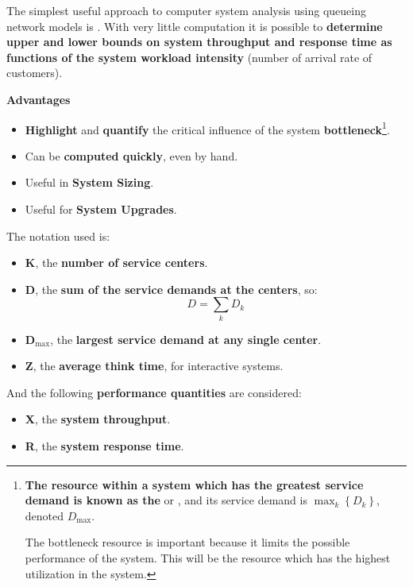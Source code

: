 The simplest useful approach to computer system analysis using queueing network models is . With very little computation it is possible to \textbf{determine upper and lower bounds on system throughput and response time as functions of the system workload intensity} (number of arrival rate of customers).

\highspace
\begin{flushleft}
	\textcolor{Green4}{ \textbf{Advantages}}
\end{flushleft}
\begin{itemize}
	\item \textbf{Highlight} and \textbf{quantify} the critical influence of the system \textbf{bottleneck}\footnote{%
	\textbf{The resource within a system which has the greatest service demand is known as the}  or , and its service demand is $\max_{k}\left\{D_{k}\right\}$, denoted $D_{\max}$. 
	
	The bottleneck resource is important because it limits the possible performance of the system. This will be the resource which has the highest utilization in the system.%
	}.
	\item Can be \textbf{computed quickly}, even by hand.
	\item Useful in \textbf{System Sizing}.
	\item Useful for \textbf{System Upgrades}.
\end{itemize}

\highspace
The notation used is:
\begin{itemize}
	\item \textbf{K}, the \textbf{number of service centers}.
	
	\item \textbf{D}, the \textbf{sum of the service demands at the centers}, so:
	\begin{equation}
		D = \displaystyle\sum_{k}D_{k}
	\end{equation}
	
	\item $\mathbf{D}_{\max}$, the \textbf{largest service demand at any single center}.
	
	\item \textbf{Z}, the \textbf{average think time}, for interactive systems.
\end{itemize}
And the following \textbf{performance quantities} are considered:
\begin{itemize}
	\item \textbf{X}, the \textbf{system throughput}.
	
	\item \textbf{R}, the \textbf{system response time}.
\end{itemize}

